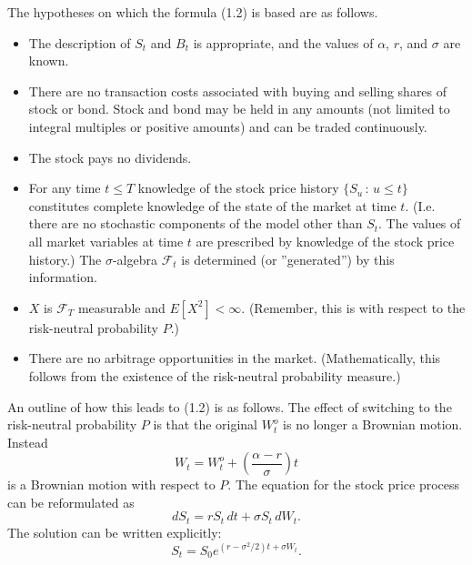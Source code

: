 The hypotheses on which the formula (1.2) is based are as follows.
\begin{itemize}
\item The description of $S_{t}$ and $B_{t}$ is appropriate, and the values of $\alpha$, $r$, and $\sigma$ are known.
\item There are no transaction costs associated with buying and selling shares of stock or bond. Stock and bond may be held in any amounts (not limited to integral multiples or positive amounts) and can be traded continuously.
\item The stock pays no dividends.
\item For any time $t\leq T$ knowledge of the stock price history $\{S_{u}\,:\,u\leq t\}$ constitutes complete knowledge of the state of the market at time $t$. (I.e. there are no stochastic components of the model other than $S_{t}$. The values of all market variables at time $t$ are prescribed by knowledge of the stock price history.) The $\sigma$-algebra $\mathcal{F}_{t}$ is determined (or ''generated'') by this information.
\item $X$ is $\mathcal{F}_{T}$ measurable and $E[X^{2}]<\infty$. (Remember, this is with respect to the risk-neutral probability $P$.)
\item There are no arbitrage opportunities in the market. (Mathematically, this follows from the existence of the risk-neutral probability measure.)
\end{itemize}

An outline of how this leads to (1.2) is as follows. The effect of switching to the risk-neutral probability $P$ is that the original $W_{t}^{o}$ is no longer a Brownian motion. Instead
\begin{equation*}
W_{t}=W_{t}^{o}+\left(\frac{\alpha-r}{\sigma}\right)t \tag{1.3}
\end{equation*}
is a Brownian motion with respect to $P$. The equation for the stock price process can be reformulated as
\begin{equation*}
dS_{t}=rS_{t}\, dt+\sigma S_{t}\, dW_{t}. \tag{1.4}
\end{equation*}
The solution can be written explicitly:
\begin{equation*}
S_{t}=S_{0}e^{(r-\sigma^{2}/2)t+\sigma W_{t}}.
\end{equation*}

